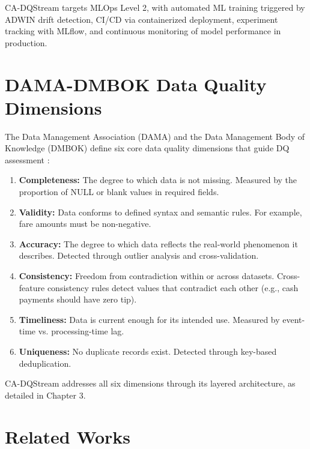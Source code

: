 CA-DQStream targets MLOps Level 2, with automated ML training triggered by ADWIN drift detection, CI/CD via containerized deployment, experiment tracking with MLflow, and continuous monitoring of model performance in production.

\section{DAMA-DMBOK Data Quality Dimensions}

The Data Management Association (DAMA) and the Data Management Body of Knowledge (DMBOK) define six core data quality dimensions that guide DQ assessment \citep{dama2017dmbok}:

\begin{enumerate}
    \item \textbf{Completeness:} The degree to which data is not missing. Measured by the proportion of NULL or blank values in required fields.
    \item \textbf{Validity:} Data conforms to defined syntax and semantic rules. For example, fare amounts must be non-negative.
    \item \textbf{Accuracy:} The degree to which data reflects the real-world phenomenon it describes. Detected through outlier analysis and cross-validation.
    \item \textbf{Consistency:} Freedom from contradiction within or across datasets. Cross-feature consistency rules detect values that contradict each other (e.g., cash payments should have zero tip).
    \item \textbf{Timeliness:} Data is current enough for its intended use. Measured by event-time vs. processing-time lag.
    \item \textbf{Uniqueness:} No duplicate records exist. Detected through key-based deduplication.
\end{enumerate}

CA-DQStream addresses all six dimensions through its layered architecture, as detailed in Chapter 3.

\section{Related Works}

